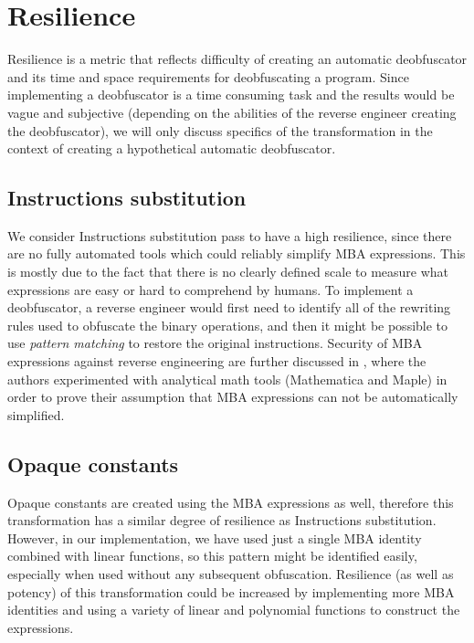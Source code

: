 \documentclass[
  digital, %
  notable,   %
  twoside, %
  nolof,     %
  nolot,     %
]{fithesis3}
\theoremstyle{definition}
\begin{document}
\section{Resilience}

Resilience is a metric that reflects difficulty of creating an automatic deobfuscator and its time and space requirements for deobfuscating a program. Since implementing a deobfuscator is a time consuming task and the results would be vague and subjective (depending on the abilities of the reverse engineer creating the deobfuscator), we will only discuss specifics of the transformation in the context of creating a hypothetical automatic deobfuscator. 

\subsection{Instructions substitution}

We consider Instructions substitution pass to have a high resilience, since there are no fully automated tools which could reliably simplify MBA expressions. This is mostly due to the fact that there is no clearly defined scale to measure what expressions are easy or hard to comprehend by humans. To implement a deobfuscator, a reverse engineer would first need to identify all of the rewriting rules used to obfuscate the binary operations, and then it might be possible to use \textit{pattern matching} to restore the original instructions. Security of MBA expressions against reverse engineering are further discussed in \cite{mba_zhou}, where the authors experimented with analytical math tools (Mathematica and Maple) in order to prove their assumption that MBA expressions can not be automatically simplified. 

\subsection{Opaque constants}

Opaque constants are created using the MBA expressions as well, therefore this transformation has a similar degree of resilience as Instructions substitution. However, in our implementation, we have used just a single MBA identity combined with linear functions, so this pattern might be identified easily, especially when used without any subsequent obfuscation. Resilience (as well as potency) of this transformation could be increased by implementing more MBA identities and using a variety of linear and polynomial functions to construct the expressions. 
\end{document}
